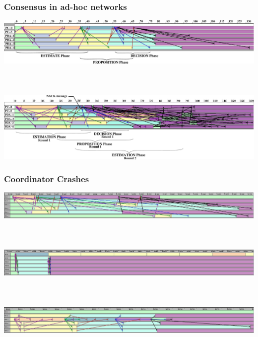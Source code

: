 \begin{frame}
\frametitle{Consensus in ad-hoc networks}
\includegraphics[width=\textwidth]{figures/Consensus1.pdf}
~\\
~\\
~\\
\includegraphics[width=\textwidth]{figures/Consensus2.pdf}

\end{frame}


\begin{frame}
\frametitle{Coordinator Crashes}

\includegraphics[width=\textwidth]{figures/trace3a.pdf}
~\\
~\\
~\\
\includegraphics[width=\textwidth]{figures/trace3b.pdf}
~\\
~\\
~\\
\includegraphics[width=\textwidth]{figures/trace3c.pdf}
\end{frame}


